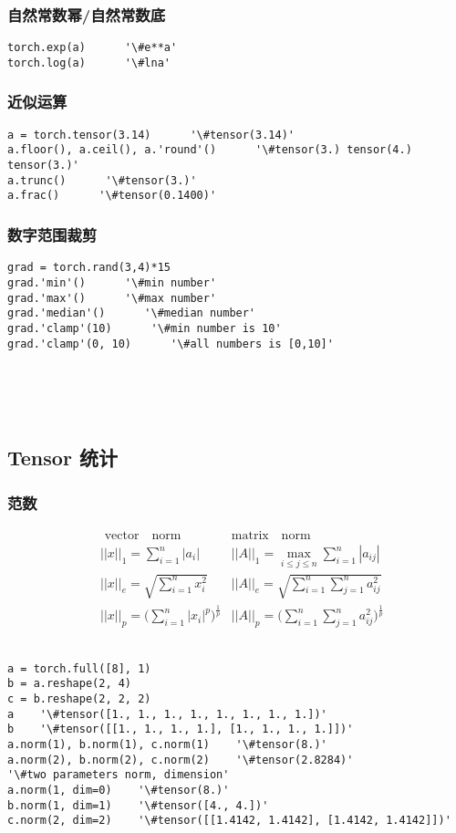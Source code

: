 \subsubsection{自然常数幂/自然常数底}
\begin{lstlisting}
torch.exp(a)      '\#e**a'
torch.log(a)      '\#lna'
\end{lstlisting}

\subsubsection{近似运算}
\begin{lstlisting}
a = torch.tensor(3.14)      '\#tensor(3.14)'
a.floor(), a.ceil(), a.'round'()      '\#tensor(3.) tensor(4.) tensor(3.)'
a.trunc()      '\#tensor(3.)'
a.frac()      '\#tensor(0.1400)'
\end{lstlisting}

\subsubsection{数字范围裁剪}
\begin{lstlisting}
grad = torch.rand(3,4)*15
grad.'min'()      '\#min number'
grad.'max'()      '\#max number'
grad.'median'()      '\#median number'
grad.'clamp'(10)      '\#min number is 10'
grad.'clamp'(0, 10)      '\#all numbers is [0,10]'
\end{lstlisting}
~\\
~\\
~\\




\subsection{Tensor 统计}
\subsubsection{范数}
  \begin{align*}
  &\text{~vector ~~norm}   &\text{matrix~~ norm~~~~~~~~~~}\\
  &||x||_1 = \sum_{i=1}^{n}|a_i| &||A||_1=\max\limits_{i\le j \le n}\sum_{i=1}^{n}|a_{ij}|\\
  &||x||_e = \sqrt{\sum_{i=1}^{n}x_i^2}   &||A||_e=\sqrt{\sum_{i=1}^{n}\sum_{j=1}^{n}a_{ij}^2}\\
  &||x||_p = \Big(\sum_{i=1}^{n}|x_i|^p\Big)^{\frac{1}{p}}  &||A||_p=\Big(\sum_{i=1}^{n}\sum_{j=1}^{n}a_{ij}^2\Big)^{\frac{1}{p}}
  \end{align*}
  ~\\
\begin{lstlisting}
a = torch.full([8], 1)
b = a.reshape(2, 4)
c = b.reshape(2, 2, 2)
a    '\#tensor([1., 1., 1., 1., 1., 1., 1., 1.])'
b    '\#tensor([[1., 1., 1., 1.], [1., 1., 1., 1.]])'
a.norm(1), b.norm(1), c.norm(1)    '\#tensor(8.)'
a.norm(2), b.norm(2), c.norm(2)    '\#tensor(2.8284)'
'\#two parameters norm, dimension'
a.norm(1, dim=0)    '\#tensor(8.)'
b.norm(1, dim=1)    '\#tensor([4., 4.])'
c.norm(2, dim=2)    '\#tensor([[1.4142, 1.4142], [1.4142, 1.4142]])'
\end{lstlisting}

